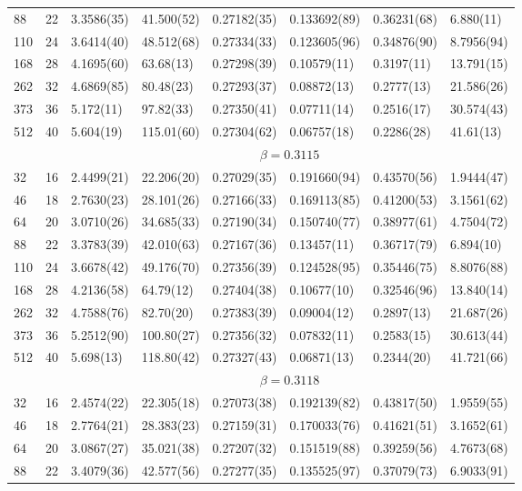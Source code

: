 \documentclass[12pt]{article}
\begin{document}
\begin{table}
\begin{tabular}{llllllll}
88 & 22 & 3.3586(35) & 41.500(52) & 0.27182(35) & 0.133692(89) & 0.36231(68) & 6.880(11)\\ 
110 & 24 & 3.6414(40) & 48.512(68) & 0.27334(33) & 0.123605(96) & 0.34876(90) & 8.7956(94)\\ 
168 & 28 & 4.1695(60) & 63.68(13) & 0.27298(39) & 0.10579(11) & 0.3197(11) & 13.791(15)\\ 
262 & 32 & 4.6869(85) & 80.48(23) & 0.27293(37) & 0.08872(13) & 0.2777(13) & 21.586(26)\\ 
373 & 36 & 5.172(11) & 97.82(33) & 0.27350(41) & 0.07711(14) & 0.2516(17) & 30.574(43)\\ 
512 & 40 & 5.604(19) & 115.01(60) & 0.27304(62) & 0.06757(18) & 0.2286(28) & 41.61(13)\\ 
\hline 
  & & \multicolumn{6}{c}{$ \beta = 0.3115 $} \\ 
 \hline 
32 & 16 & 2.4499(21) & 22.206(20) & 0.27029(35) & 0.191660(94) & 0.43570(56) & 1.9444(47)\\ 
46 & 18 & 2.7630(23) & 28.101(26) & 0.27166(33) & 0.169113(85) & 0.41200(53) & 3.1561(62)\\ 
64 & 20 & 3.0710(26) & 34.685(33) & 0.27190(34) & 0.150740(77) & 0.38977(61) & 4.7504(72)\\ 
88 & 22 & 3.3783(39) & 42.010(63) & 0.27167(36) & 0.13457(11) & 0.36717(79) & 6.894(10)\\ 
110 & 24 & 3.6678(42) & 49.176(70) & 0.27356(39) & 0.124528(95) & 0.35446(75) & 8.8076(88)\\ 
168 & 28 & 4.2136(58) & 64.79(12) & 0.27404(38) & 0.10677(10) & 0.32546(96) & 13.840(14)\\ 
262 & 32 & 4.7588(76) & 82.70(20) & 0.27383(39) & 0.09004(12) & 0.2897(13) & 21.687(26)\\ 
373 & 36 & 5.2512(90) & 100.80(27) & 0.27356(32) & 0.07832(11) & 0.2583(15) & 30.613(44)\\ 
512 & 40 & 5.698(13) & 118.80(42) & 0.27327(43) & 0.06871(13) & 0.2344(20) & 41.721(66)\\ 
\hline 
  & & \multicolumn{6}{c}{$ \beta = 0.3118 $} \\ 
 \hline 
32 & 16 & 2.4574(22) & 22.305(18) & 0.27073(38) & 0.192139(82) & 0.43817(50) & 1.9559(55)\\ 
46 & 18 & 2.7764(21) & 28.383(23) & 0.27159(31) & 0.170033(76) & 0.41621(51) & 3.1652(61)\\ 
64 & 20 & 3.0867(27) & 35.021(38) & 0.27207(32) & 0.151519(88) & 0.39259(56) & 4.7673(68)\\ 
88 & 22 & 3.4079(36) & 42.577(56) & 0.27277(35) & 0.135525(97) & 0.37079(73) & 6.9033(91)\\ 

\end{tabular}
\end{table}
\end{document}
